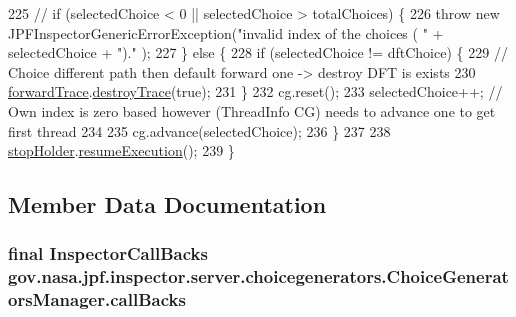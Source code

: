\begin{DoxyCode}
225       \textcolor{comment}{// if (selectedChoice < 0 || selectedChoice > totalChoices) \{}
226       \textcolor{keywordflow}{throw} \textcolor{keyword}{new} JPFInspectorGenericErrorException(\textcolor{stringliteral}{"invalid index of the choices ( "} + selectedChoice + \textcolor{stringliteral}{")."}
      );
227     \} \textcolor{keywordflow}{else} \{
228       \textcolor{keywordflow}{if} (selectedChoice != dftChoice) \{
229         \textcolor{comment}{// Choice different path then default forward one -> destroy DFT is exists}
230         \hyperlink{classgov_1_1nasa_1_1jpf_1_1inspector_1_1server_1_1choicegenerators_1_1_choice_generators_manager_af50c2456f9d16dcf53d9bd26bc279b29}{forwardTrace}.\hyperlink{classgov_1_1nasa_1_1jpf_1_1inspector_1_1server_1_1breakpoints_1_1_default_forward_trace_manager_ac5e4e8802d8b3ccea7df4dd3b3a45357}{destroyTrace}(\textcolor{keyword}{true});
231       \}
232       cg.reset();
233       selectedChoice++; \textcolor{comment}{// Own index is zero based however (ThreadInfo CG) needs to advance one to get
       first thread}
234 
235       cg.advance(selectedChoice);
236     \}
237 
238     \hyperlink{classgov_1_1nasa_1_1jpf_1_1inspector_1_1server_1_1choicegenerators_1_1_choice_generators_manager_af24775b2d725979fea9639be757ea85a}{stopHolder}.\hyperlink{classgov_1_1nasa_1_1jpf_1_1inspector_1_1server_1_1jpf_1_1_stop_holder_a2c9b742cc32a8f8b150df3a920250f29}{resumeExecution}();
239   \}
\end{DoxyCode}


\subsection{Member Data Documentation}
\subsubsection[{\texorpdfstring{call\+Backs}{callBacks}}]{\setlength{\rightskip}{0pt plus 5cm}final {\bf Inspector\+Call\+Backs} gov.\+nasa.\+jpf.\+inspector.\+server.\+choicegenerators.\+Choice\+Generators\+Manager.\+call\+Backs\hspace{0.3cm}{\ttfamily [private]}}\hypertarget{classgov_1_1nasa_1_1jpf_1_1inspector_1_1server_1_1choicegenerators_1_1_choice_generators_manager_a14d8c4ceb0f5b46af959a32499c0d47f}{}\label{classgov_1_1nasa_1_1jpf_1_1inspector_1_1server_1_1choicegenerators_1_1_choice_generators_manager_a14d8c4ceb0f5b46af959a32499c0d47f}


